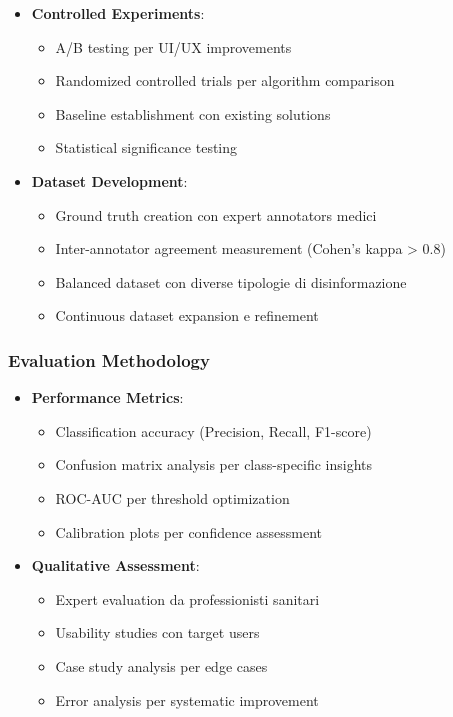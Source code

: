 \documentclass[12pt,a4paper]{report}
\begin{document}
\begin{itemize}
    \item \textbf{Controlled Experiments}:
    \begin{itemize}
        \item A/B testing per UI/UX improvements
        \item Randomized controlled trials per algorithm comparison
        \item Baseline establishment con existing solutions
        \item Statistical significance testing
    \end{itemize}
    
    \item \textbf{Dataset Development}:
    \begin{itemize}
        \item Ground truth creation con expert annotators medici
        \item Inter-annotator agreement measurement (Cohen's kappa > 0.8)
        \item Balanced dataset con diverse tipologie di disinformazione
        \item Continuous dataset expansion e refinement
    \end{itemize}
\end{itemize}

\subsubsection{Evaluation Methodology}

\begin{itemize}
    \item \textbf{Performance Metrics}:
    \begin{itemize}
        \item Classification accuracy (Precision, Recall, F1-score)
        \item Confusion matrix analysis per class-specific insights
        \item ROC-AUC per threshold optimization
        \item Calibration plots per confidence assessment
    \end{itemize}
    
    \item \textbf{Qualitative Assessment}:
    \begin{itemize}
        \item Expert evaluation da professionisti sanitari
        \item Usability studies con target users
        \item Case study analysis per edge cases
        \item Error analysis per systematic improvement
    \end{itemize}
\end{itemize}
\end{document}
